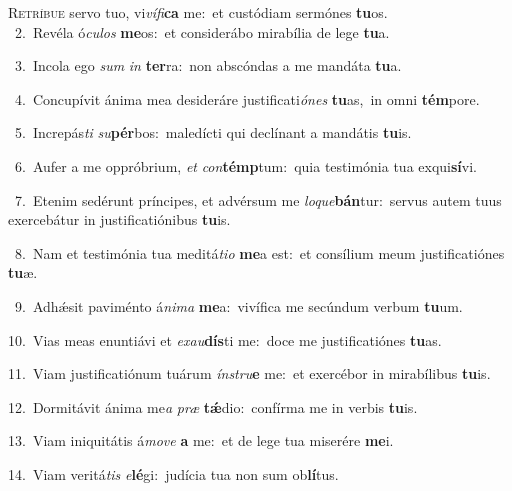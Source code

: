 \lettrine{\initial\textcolor{\initialcolor}{R}}{etríbue} servo tuo, vi\-\textit{ví}\-\textit{fi}\textbf{ca} me:~\star et custódiam sermónes \textbf{tu}\-os.\\
{\numbfont\textcolor{\numbcolor}{~2.}}~Revéla ó\-\textit{cu}\-\textit{los} \textbf{me}\-os:~\star et considerábo mirabília de lege \textbf{tu}\-a.\par
{\numbfont\textcolor{\numbcolor}{~3.}}~Incola ego \textit{sum} \textit{in} \textbf{ter}\-ra:~\star non abscóndas a me mandáta \textbf{tu}\-a.\par
{\numbfont\textcolor{\numbcolor}{~4.}}~Concupívit ánima mea desideráre justificati\-\textit{ó}\-\textit{nes} \textbf{tu}\-as,~\star in omni \textbf{tém}\-pore.\par
{\numbfont\textcolor{\numbcolor}{~5.}}~Increpás\textit{ti} \textit{su}\-\textbf{pér}bos:~\star maledícti qui declínant a mandátis \textbf{tu}\-is.\par
{\numbfont\textcolor{\numbcolor}{~6.}}~Aufer a me oppróbrium, \textit{et} \textit{con}\-\textbf{témp}tum:~\star quia testimónia tua exqui\-\textbf{sí}\-vi.\par
{\numbfont\textcolor{\numbcolor}{~7.}}~Etenim sedérunt príncipes, et advérsum me \textit{lo}\-\textit{que}\textbf{bán}tur:~\star servus autem tuus exercebátur in justificatiónibus \textbf{tu}\-is.\par
{\numbfont\textcolor{\numbcolor}{~8.}}~Nam et testimónia tua meditá\-\textit{ti}\-\textit{o} \textbf{me}\-a est:~\star et consílium meum justificatiónes \textbf{tu}\-æ.\par
{\numbfont\textcolor{\numbcolor}{~9.}}~Adhǽsit paviménto á\-\textit{ni}\-\textit{ma} \textbf{me}\-a:~\star vivífica me secúndum verbum \textbf{tu}\-um.\par
{\numbfont\textcolor{\numbcolor}{10.}}~Vias meas enuntiávi et \textit{ex}\-\textit{au}\textbf{dís}ti me:~\star doce me justificatiónes \textbf{tu}\-as.\par
{\numbfont\textcolor{\numbcolor}{11.}}~Viam justificatiónum tuárum \textit{ín}\-\textit{stru}\textbf{e} me:~\star et exercébor in mirabílibus \textbf{tu}\-is.\par
{\numbfont\textcolor{\numbcolor}{12.}}~Dormitávit ánima me\textit{a} \textit{præ} \textbf{tǽ}\-dio:~\star confírma me in verbis \textbf{tu}\-is.\par
{\numbfont\textcolor{\numbcolor}{13.}}~Viam iniquitátis á\-\textit{mo}\-\textit{ve} \textbf{a} me:~\star et de lege tua miserére \textbf{me}\-i.\par
{\numbfont\textcolor{\numbcolor}{14.}}~Viam veritá\textit{tis} \textit{e}\-\textbf{lé}gi:~\star judícia tua non sum ob\-\textbf{lí}\-tus.\par
